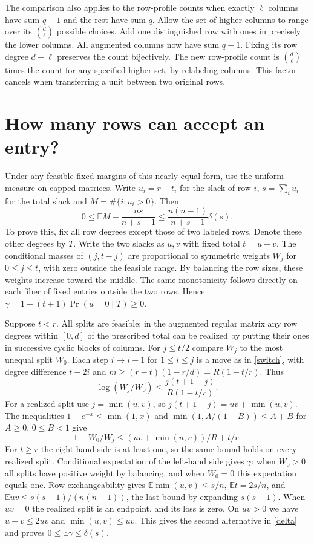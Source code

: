 \documentclass[11pt]{article}
\newcommand{\E}{\mathbb E}
\begin{document}
The comparison also applies to the row-profile counts when exactly $\ell$ columns have sum $q+1$ and the rest have sum $q$. Allow the set of higher columns to range over its $\binom d\ell$ possible choices. Add one distinguished row with ones in precisely the lower columns. All augmented columns now have sum $q+1$. Fixing its row degree $d-\ell$ preserves the count bijectively. The new row-profile count is $\binom d\ell$ times the count for any specified higher set, by relabeling columns. This factor cancels when transferring a unit between two original rows.

\section{How many rows can accept an entry?}
Under any feasible fixed margins of this nearly equal form, use the uniform measure on capped matrices. Write $u_i=r-t_i$ for the slack of row $i$, $s=\sum_i u_i$ for the total slack and $M=\#\{i:u_i>0\}$. Then
\begin{equation}\label{active}
 0\le \E M-\frac{ns}{n+s-1}\le
 \frac{n(n-1)}{n+s-1}\delta(s).
\end{equation}
To prove this, fix all row degrees except those of two labeled rows. Denote these other degrees by $T$. Write the two slacks as $u,v$ with fixed total $t=u+v$. The conditional masses of $(j,t-j)$ are proportional to symmetric weights $W_j$ for $0\le j\le t$, with zero outside the feasible range. By balancing the row sizes, these weights increase toward the middle. The same monotonicity follows directly on each fiber of fixed entries outside the two rows. Hence $\gamma=1-(t+1)\Pr(u=0\mid T)\ge0$.

Suppose $t<r$. All splits are feasible: in the augmented regular matrix any row degrees within $[0,d]$ of the prescribed total can be realized by putting their ones in successive cyclic blocks of columns. For $j\le t/2$ compare $W_j$ to the most unequal split $W_0$. Each step $i\to i-1$ for $1\le i\le j$ is a move as in \eqref{switch}, with degree difference $t-2i$ and $m\ge(r-t)(1-r/d)=R(1-t/r)$. Thus
\[
 \log(W_j/W_0)\le\frac{j(t+1-j)}{R(1-t/r)}.
\]
For a realized split use $j=\min(u,v)$, so $j(t+1-j)=uv+\min(u,v)$. The inequalities $1-e^{-x}\le\min(1,x)$ and $\min(1,A/(1-B))\le A+B$ for $A\ge0$, $0\le B<1$ give
\[
 1-W_0/W_j\le (uv+\min(u,v))/R+t/r .
\]
For $t\ge r$ the right-hand side is at least one, so the same bound holds on every realized split. Conditional expectation of the left-hand side gives $\gamma$: when $W_0>0$ all splits have positive weight by balancing, and when $W_0=0$ this expectation equals one. Row exchangeability gives $\E\min(u,v)\le s/n$, $\E t=2s/n$, and $\E uv\le s(s-1)/(n(n-1))$, the last bound by expanding $s(s-1)$. When $uv=0$ the realized split is an endpoint, and its loss is zero. On $uv>0$ we have $u+v\le2uv$ and $\min(u,v)\le uv$. This gives the second alternative in \eqref{delta} and proves $0\le\E\gamma\le\delta(s)$.
\end{document}
